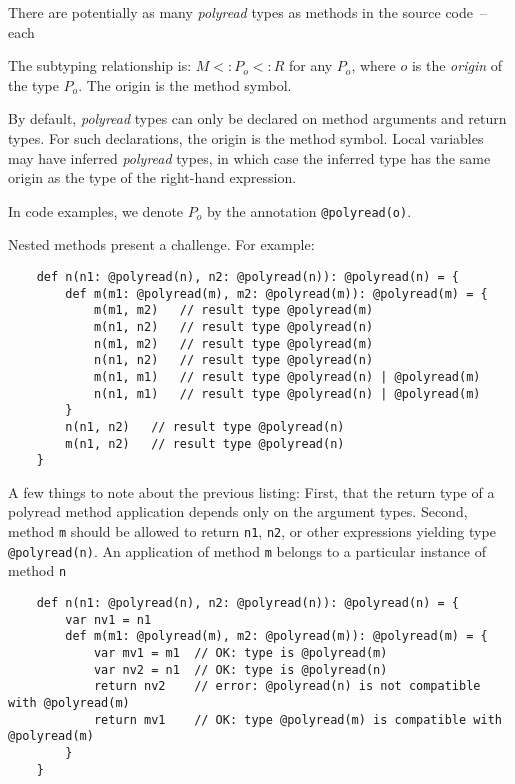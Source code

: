 \documentclass[letterpaper,11pt]{article}
\newcommand{\code}[1]{\lstinline$#1$}
\begin{document}
There are potentially as many \emph{polyread} types as methods in the source code~--
each 


The subtyping relationship is:
$M <: P_o <: R$ for any $P_o$,
where $o$ is the \emph{origin} of the type $P_o$.
The origin is the method symbol.

By default, \emph{polyread} types can only be declared on method arguments and return types.
For such declarations, the origin is the method symbol.
Local variables may have inferred \emph{polyread} types, in which case the inferred type has the
same origin as the type of the right-hand expression.

In code examples, we denote $P_o$ by the annotation \code{@polyread(o)}.

Nested methods present a challenge.
For example:

\begin{lstlisting}
	def n(n1: @polyread(n), n2: @polyread(n)): @polyread(n) = {
		def m(m1: @polyread(m), m2: @polyread(m)): @polyread(m) = {
			m(m1, m2)   // result type @polyread(m)
			m(n1, n2)   // result type @polyread(n)
			n(m1, m2)   // result type @polyread(m)
			n(n1, n2)   // result type @polyread(n)
			m(n1, m1)   // result type @polyread(n) | @polyread(m)
			n(n1, m1)   // result type @polyread(n) | @polyread(m)
		}
		n(n1, n2)   // result type @polyread(n)
		m(n1, n2)   // result type @polyread(n)
	}
\end{lstlisting}

A few things to note about the previous listing:
First, that the return type of a polyread method application depends only
on the argument types.
Second, method \code{m} should be allowed to return \code{n1}, \code{n2},
or other expressions yielding type \code{@polyread(n)}.
An application of method \code{m} belongs to a particular instance of method \code{n}

\begin{lstlisting}
	def n(n1: @polyread(n), n2: @polyread(n)): @polyread(n) = {
		var nv1 = n1
		def m(m1: @polyread(m), m2: @polyread(m)): @polyread(m) = {
			var mv1 = m1  // OK: type is @polyread(m)
			var nv2 = n1  // OK: type is @polyread(n)
			return nv2    // error: @polyread(n) is not compatible with @polyread(m)
			return mv1    // OK: type @polyread(m) is compatible with @polyread(m)
		}
	}
\end{lstlisting}


%
%
%
%
\end{document}
